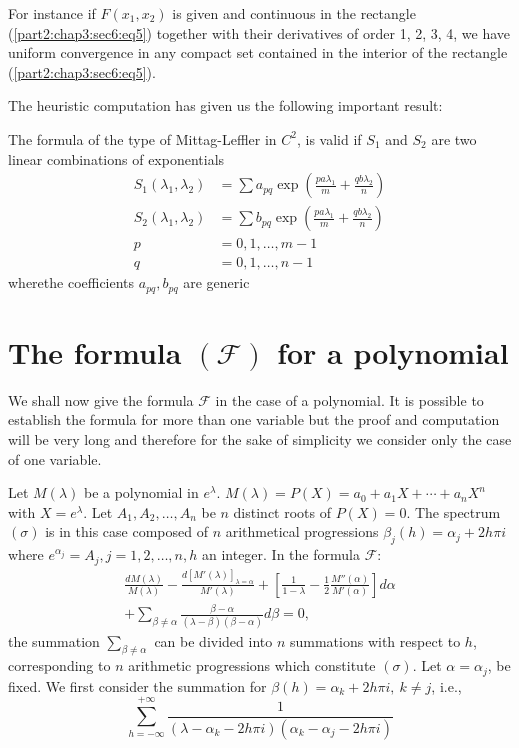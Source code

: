 For instance if $F(x_1, x_2)$ is given and continuous in the rectangle
(\ref{part2:chap3:sec6:eq5}) together with their derivatives of order
1, 2, 3, 4, we have 
uniform convergence in any compact set contained in the interior of
the rectangle (\ref{part2:chap3:sec6:eq5}). 

The heuristic computation has given us the following important result:

The formula of the type of Mittag-Leffler in $C^2$, is valid if $S_1$
and $S_2$ are two linear combinations of exponentials 
\begin{align*}
  S_1(\lambda_1, \lambda_2) & = \sum a_{pq} \exp(\frac{pa
    \lambda_1}{m} + \frac{qb \lambda_2}{n})\\ 
  S_2(\lambda_1, \lambda_2) & = \sum b_{pq} \exp(\frac{pa
    \lambda_1}{m} + \frac{qb \lambda_2}{n})\\ 
  p & = 0, 1,  \ldots,  m-1\\
  q & = 0, 1, \ldots,  n-1
\end{align*}
where\pageoriginale the coefficients $a_{pq},  b_{pq}$ are generic

\section{The formula $(\mathscr{F})$ for a polynomial}\label{part2:chap3:sec7}

We shall now give the formula $\mathscr{F}$ in the case of a
polynomial. It is possible to establish the formula for more than one
variable but the proof and computation will be very long and therefore
for the sake of simplicity we consider only the case of one variable. 

Let $M(\lambda)$ be a polynomial in $e^\lambda$. $M(\lambda) = P(X) =
a_0 + a_1 X + \cdots + a_n X^n$ with $X = e^\lambda$. Let $A_1, A_2,
\ldots,  A_n$ be $n$ distinct roots of $P(X) = 0$. The spectrum
$(\sigma)$ is in this case composed of $n$ arithmetical progressions
$\beta_j (h) = \alpha_j + 2h \pi i$ where $e^{\alpha_j} = A_j,  j =1,
2, \ldots,  n,  h$ an integer. In the formula $\mathscr{F}$: 
\begin{multline*}
\frac{d M(\lambda)} {M(\lambda)} - \frac{d [M'(\lambda)]_{\lambda = \alpha}}
     {M'(\lambda)}  + \left[ \frac{1}{1 - \lambda} -
       \frac{1}{2} \frac{ M''(\alpha)} {M'(\alpha)} \right] d
     \alpha\\ 
     + \sum_{\beta \ne \alpha} \frac{\beta - \alpha} {(\lambda - \beta)
       (\beta - \alpha)} d \beta = 0,  
\end{multline*}
the summation $\sum\limits_{\beta \neq \alpha}$ can be divided into
$n$ summations with respect to $h$, corresponding to $n$ arithmetic
progressions which constitute $(\sigma)$. Let $\alpha = \alpha_j$, be
fixed. We first consider the summation for $\beta(h) = \alpha_k + 2h
\pi i,  ~ k \ne j$,  i.e., 
\begin{equation}
  \sum^{+ \infty}_{h = -\infty} \frac{1}{(\lambda - \alpha_k - 2h \pi
    i) (\alpha_k - \alpha_j - 2h \pi i)} \tag{1}\label{part2:chap3:sec7:eq1} 
\end{equation}

